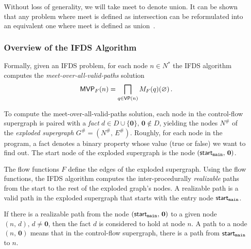 Without loss of generality, we will take meet to denote union. It can be shown that any problem where meet is defined as intersection can be reformulated into an equivalent one where meet is defined as union~\cite{reps1995precise}.

\subsubsection{Overview of the IFDS Algorithm}\label{sec:overviewifds}
Formally, given an IFDS problem, for each node $n\in N^*$ the IFDS algorithm computes the \textit{meet-over-all-valid-paths} solution
\begin{equation}
 \textsf{MVP}_{F}(n)=\bigsqcap_{q\in\textsf{VP}(n)}M_F(q)(\varnothing)\,.
\end{equation}

To compute the meet-over-all-valid-paths solution, each node in the control-flow supergraph is paired with a \textit{fact} $d\in D\cup\{\mathbf0\},\,\mathbf0\notin D$, yielding the nodes $N^\#$ of the \textit{exploded supergraph} $G^\#=(N^\#,\,E^\#)$.
Roughly, for each node in the program, a fact denotes a binary property whose value (true or false) we want to find out.
The start node of the exploded supergraph is the node $(\textsf{start}_\texttt{main},\,\mathbf0)$.

The flow functions $F$ define the edges of the exploded supergraph.
Using the flow functions, the IFDS algorithm computes the inter-procedurally \textit{realizable} paths from the start to the rest of the exploded graph's nodes. A realizable path is a valid path in the exploded supergraph that starts with the entry node $\textsf{start}_\texttt{main}$.

If there is a realizable path from the node $(\textsf{start}_\texttt{main},\,\mathbf0)$ to a given node $(n,\,d),\,d\ne\mathbf0$, then the fact $d$ is considered to hold at node $n$. A path to a node $(n,\,\mathbf0)$ means that in the control-flow supergraph, there is a path from $\textsf{start}_\texttt{main}$ to $n$.

